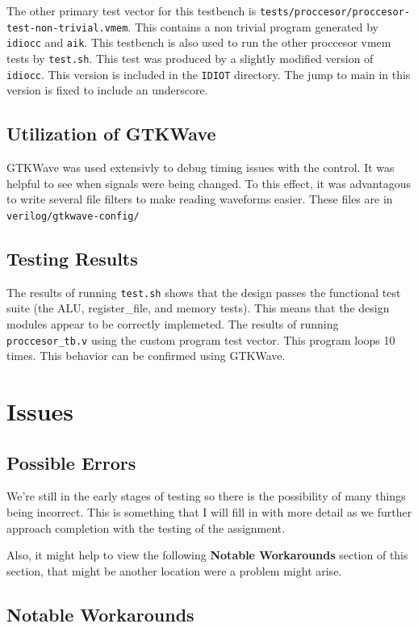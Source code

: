 \documentclass[conference]{IEEEtran}
\begin{document}
The other primary test vector for this testbench is
\texttt{tests/proccesor/proccesor-test-non-trivial.vmem}. This
contains a non trivial program generated by \texttt{idiocc} and \texttt{aik}. 
This testbench is also used to run the other proccesor vmem tests by 
\texttt{test.sh}. This test was produced by a slightly modified version of 
\texttt{idiocc}. This version is included in the \texttt{IDIOT} directory.
The jump to main in this version is fixed to include an underscore.

\subsection{Utilization of GTKWave}
GTKWave was used extensivly to debug timing issues with the control. It was 
helpful to see when signals were being changed. To this effect, it was 
advantagous to write several file filters to make reading waveforms easier.
These files are in \texttt{verilog/gtkwave-config/}

\subsection{Testing Results}
The results of running \texttt{test.sh} shows that the design passes the
functional test suite (the ALU, register\_file, and memory tests). This means
that the design modules appear to be correctly implemeted. The results of 
running \texttt{proccesor\_tb.v} using the custom program test vector. This
program loops 10 times. This behavior can be confirmed using GTKWave.

\section{Issues}
\subsection{Possible Errors}
We're still in the early stages of testing so there is the possibility of many things 
being incorrect. This is something that I will fill in with more detail as we 
further approach completion with the testing of the assignment.

Also, it might help to view the following \textbf{Notable Workarounds} section
of this section, that might be another location were a problem might arise.

\subsection{Notable Workarounds}
\end{document}

